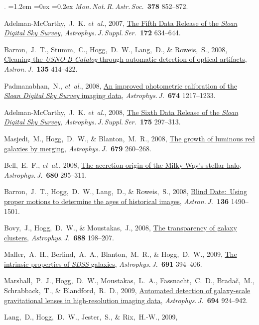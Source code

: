 \documentclass[10pt,letterpaper]{article}
\newcommand{\acronym}[1]{{\small{#1}}}
\newcommand{\foreign}[1]{\textsl{#1}}
\newcommand{\etal}{\foreign{et~al.}}
\newcommand{\project}[1]{\textsl{#1}}
\newcommand{\doi}[2]{\href{http://dx.doi.org/#1}{{#2}}}
\newcommand{\deemph}[1]{\textcolor{grey}{\footnotesize{#1}}}
\newcommand{\pubnumber}[1]{\deemph{{#1}.}}
\newcounter{refpubnum}
\newcommand{\hogglist}{%
    \rightmargin=0in
    \leftmargin=1.2em
    \topsep=0ex
    \partopsep=0pt
    \itemsep=0.2ex
    \parsep=0pt
    \itemindent=-1.0\leftmargin
    \listparindent=0.0\leftmargin
    \settowidth{\labelsep}{~}
    \usecounter{refpubnum}
  }
\begin{document}
\begin{list}{\pubnumber{\therefpubnum}}{\hogglist}
\textit{Mon.\,Not.\,R.\,Astr.\,Soc.}\ \textbf{378} 852--872.
\item
Adelman-McCarthy,~J.~K. \etal, 2007,
\doi{10.1086/518864}{The Fifth Data Release of the \project{Sloan Digital Sky Survey}},
\textit{Astrophys.\,J.\,Suppl.\,Ser.}\ \textbf{172} 634--644.
\item
Barron,~J.~T., Stumm,~C., Hogg,~D.~W., Lang,~D., \& Roweis,~S., 2008,
\doi{10.1088/0004-6256/135/1/414}{Cleaning the \project{\acronym{USNO-B} Catalog} through automatic detection of optical artifacts},
\textit{Astron.\,J.}\ \textbf{135} 414--422.
\item
Padmanabhan,~N., \etal, 2008,
\doi{10.1086/524677}{An improved photometric calibration of the \project{Sloan Digital Sky Survey} imaging data},
\textit{Astrophys.\,J.}\ \textbf{674} 1217--1233.
\item
Adelman-McCarthy,~J.~K. \etal, 2008,
\doi{10.1086/524984}{The Sixth Data Release of the \project{Sloan Digital Sky Survey}},
\textit{Astrophys.\,J.\,Suppl.\,Ser.}\ \textbf{175} 297--313.
\item
Masjedi,~M., Hogg,~D.~W., \& Blanton,~M.~R., 2008,
\doi{10.1086/586696}{The growth of luminous red galaxies by merging},
\textit{Astrophys.\,J.}\ \textbf{679} 260--268.
\item
Bell,~E.~F., \etal, 2008,
\doi{10.1086/588032}{The accretion origin of the Milky Way's stellar halo},
\textit{Astrophys.\,J.}\ \textbf{680} 295--311.
\item
Barron,~J.~T., Hogg,~D.~W., Lang,~D., \& Roweis,~S., 2008,
\doi{10.1088/0004-6256/136/4/1490}{Blind Date:\ Using proper motions to determine the ages of historical images},
\textit{Astron.\,J.}\ \textbf{136} 1490--1501.
\item
Bovy,~J., Hogg,~D.~W., \& Moustakas,~J., 2008,
\doi{10.1086/592187}{The transparency of galaxy clusters},
\textit{Astrophys.\,J.}\ \textbf{688} 198--207.
\item
Maller,~A.~H., Berlind,~A.~A., Blanton,~M.~R., \& Hogg,~D.~W., 2009,
\doi{10.1088/0004-637X/691/1/394}{The intrinsic properties of \project{\acronym{SDSS}} galaxies},
\textit{Astrophys.\,J.}\ \textbf{691} 394--406.
\item
Marshall,~P.~J., Hogg,~D.~W., Moustakas,~L.~A., Fassnacht,~C.~D.,
Brada\v{c},~M., Schrabback,~T., \& Blandford,~R.~D., 2009,
\doi{10.1088/0004-637X/694/2/924}{Automated detection of galaxy-scale gravitational lenses in high-resolution imaging data},
\textit{Astrophys.\,J.}\ \textbf{694} 924--942.
\item
Lang,~D., Hogg,~D.~W., Jester,~S., \& Rix,~H.-W., 2009,

\end{list}
\end{document}
